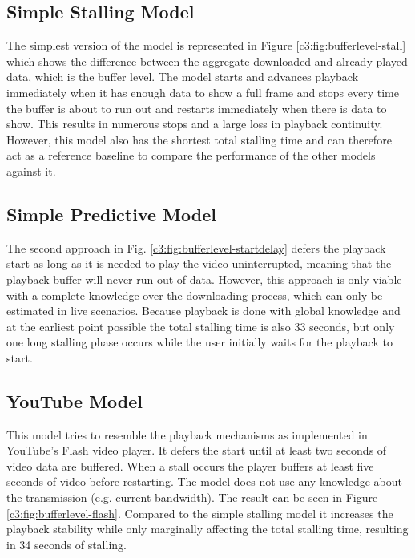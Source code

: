 \subsection{Simple Stalling Model}

The simplest version of the model is represented in Figure \ref{c3:fig:bufferlevel-stall} which shows the difference between the aggregate downloaded and already played data, which is the buffer level. The model starts and advances playback immediately when it has enough data to show a full frame and stops every time the buffer is about to run out and restarts immediately when there is data to show. This results in numerous stops and a large loss in playback continuity. However, this model also has the shortest total stalling time and can therefore act as a reference baseline to compare the performance of the other models against it.


\subsection{Simple Predictive Model}

The second approach in Fig. \ref{c3:fig:bufferlevel-startdelay} defers the playback start as long as it is needed to play the video uninterrupted, meaning that the playback buffer will never run out of data. However, this approach is only viable with a complete knowledge over the downloading process, which can only be estimated in live scenarios. Because playback is done with global knowledge and at the earliest point possible the total stalling time is also 33 seconds, but only one long stalling phase occurs while the user initially waits for the playback to start.


\subsection{YouTube Model}

This model tries to resemble the playback mechanisms as implemented in YouTube's Flash video player.
It defers the start until at least two seconds of video data are buffered. When a stall occurs the player buffers at least five seconds of video before restarting. The model does not use any knowledge about the transmission (e.g. current bandwidth).
The result can be seen in Figure \ref{c3:fig:bufferlevel-flash}. Compared to the simple stalling model it increases the playback stability while only marginally affecting the total stalling time, resulting in 34 seconds of stalling.

